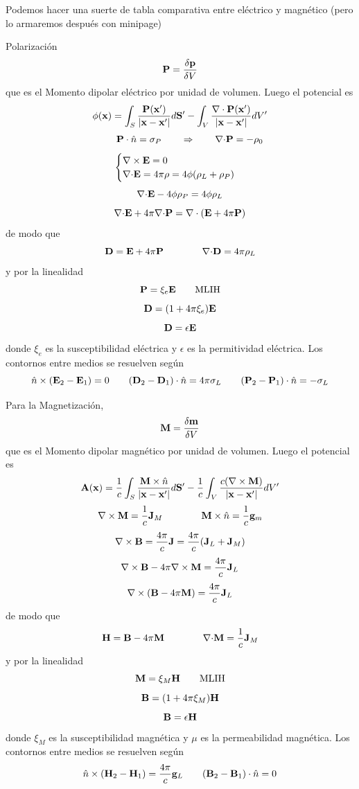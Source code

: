 \documentclass[10pt,oneside]{CBFT_book}
\begin{document}
Podemos hacer una suerte de tabla comparativa entre eléctrico y magnético
(pero lo armaremos después con minipage)

Polarización  
\[
	\vb{P} = \frac{\delta \vb{p}}{\delta V}
\]
que es el Momento dipolar eléctrico por unidad de volumen. Luego el potencial es
\[
	\phi( \vb{x}) = \int_S \frac{\vb{P}(\vb{x}')}{|\vb{x}-\vb{x}'|} d\vb{S}' - 
	\int_V \frac{\Nabla\cdot\vb{P}(\vb{x}')}{|\vb{x}-\vb{x}'|}  dV'
\]
\[
	\qquad \vb{P}\cdot\hat{n} = \sigma_P \qquad \Rightarrow \qquad \divem{P} = -\rho_0
\]
\[
	\begin{cases}
	\rotorm{E}  = 0 \\
	\divem{E} = 4\pi\rho = 4\phi( \rho_L + \rho_P )
	\end{cases}
\]
\[
	\mathbf{\nabla}\mathbf{\cdot}\mathbf{E} -  4\phi\rho_P = 4\phi\rho_L 
\]
\[
	\divem{E} + 4 \pi \divem{P} = \Nabla\cdot(\vb{E} + 4\pi\vb{P} )
\]
de modo que
\[
	\vb{D} = \vb{E} + 4 \pi \vb{P} \qquad \qquad \divem{D} = 4\pi\rho_L
\]
y por la linealidad
\[
	\vb{P} = \xi_e \vb{E} \qquad \text{MLIH}
\]
\[
	\vb{D} = ( 1 + 4\pi\xi_e ) \vb{E} 
\]
\[
	\vb{D} = \epsilon \vb{E}
\]
donde $\xi_e$ es la susceptibilidad eléctrica y $\epsilon$ es la permitividad eléctrica.
Los contornos entre medios se resuelven según
\[
	\hat{n} \times (\vb{E}_2 -\vb{E}_1) = 0 \qquad 
	(\vb{D}_2 -\vb{D}_1)\cdot\hat{n} = 4 \pi \sigma_L \qquad 
	(\vb{P}_2 -\vb{P}_1)\cdot\hat{n} = - \sigma_L
\]

Para la Magnetización,
\[
	\vb{M} = \frac{\delta \vb{m}}{\delta V}
\]
que es el Momento dipolar magnético por unidad de volumen. Luego el potencial es
\[
	\vb{A}( \vb{x}) = \frac{1}{c} \int_S \frac{ \vb{M}\times\hat{n} }{|\vb{x}-\vb{x}'|} d\vb{S}' - 
	\frac{1}{c} \int_V \frac{ c(\rotorm{M}) }{|\vb{x}-\vb{x}'|}  dV'
\]
\[
	\rotorm{M} = \frac{1}{c}\vb{J}_M \qquad \qquad \vb{M}\times\hat{n} = \frac{1}{c}\vb{g}_m
\]
\[
	\rotorm{B} = \frac{4\pi}{c}\vb{J}  = \frac{4\pi}{c}( \vb{J}_L + \vb{J}_M )
\]
\[
	\rotorm{B} - 4\pi \rotorm{M} = \frac{4\pi}{c}\vb{J}_L
\]
\[
	\Nabla\times( \vb{B} - 4\pi\vb{M} ) = \frac{4\pi}{c}\vb{J}_L 
\]
de modo que
\[
	\vb{H} = \vb{B} - 4 \pi \vb{M} \qquad \qquad \divem{M} = \frac{1}{c}\vb{J}_M  
\]
y por la linealidad
\[
	\vb{M} = \xi_M \vb{H} \qquad \text{MLIH}
\]
\[
	\vb{B} = ( 1 + 4\pi\xi_M ) \vb{H} 
\]
\[
	\vb{B} = \epsilon \vb{H}
\]
donde $\xi_M$ es la susceptibilidad magnética y $\mu$ es la permeabilidad magnética.
Los contornos entre medios se resuelven según
\[
	\hat{n} \times (\vb{H}_2 -\vb{H}_1) = \frac{4 \pi}{c} \vb{g}_L \qquad 
	(\vb{B}_2 -\vb{B}_1)\cdot\hat{n} = 0 
\]
\end{document}
